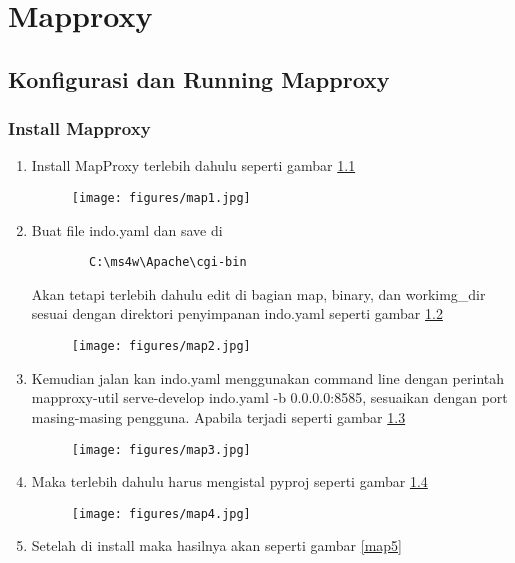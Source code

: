 \chapter{Mapproxy}
\section{Konfigurasi dan Running Mapproxy}
\subsection{Install Mapproxy}
\begin{enumerate}
    \item Install MapProxy terlebih dahulu seperti gambar \ref{map1}
\begin{figure}[!htbp]
    \centering
    \texttt{[image: figures/map1.jpg]}
    \label{map1}
\end{figure}
    \item Buat file indo.yaml dan save di

    \begin{verbatim}
        C:\ms4w\Apache\cgi-bin
    \end{verbatim}
    Akan tetapi terlebih dahulu edit di bagian map, binary, dan workimg\_dir sesuai dengan direktori penyimpanan indo.yaml seperti gambar \ref{map2}
\begin{figure}[!htbp]
    \centering
    \texttt{[image: figures/map2.jpg]}
    \label{map2}
\end{figure}
    \item Kemudian jalan kan indo.yaml menggunakan command line dengan perintah mapproxy-util serve-develop indo.yaml -b 0.0.0.0:8585, sesuaikan dengan port masing-masing pengguna. Apabila terjadi seperti gambar \ref{map3}

\begin{figure}[!htbp]
    \centering
    \texttt{[image: figures/map3.jpg]}
    \label{map3}
\end{figure}
    \item Maka terlebih dahulu harus mengistal pyproj seperti gambar \ref{map4}
\begin{figure}[!htbp]
    \centering
    \texttt{[image: figures/map4.jpg]}
    \label{map4}
\end{figure}
    \item Setelah di install maka hasilnya akan seperti gambar \ref{map5}
\begin{figure}[!htbp]

\end{figure}
\end{enumerate}
